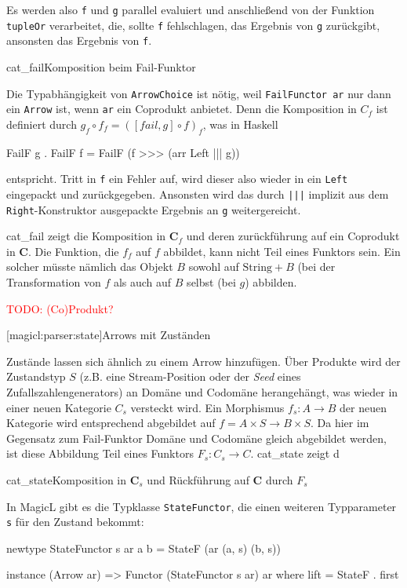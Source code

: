 \documentclass[a4paper, bibgerm]{book}
\newcommand\icode[1]{\lstinline?#1?}
\newcommand{\todo}[1]{
  \textcolor{red}{TODO: #1}
}
\newcommand\lsubsection{}
\newcommand\abb{}
\newcommand\fig{}
\newcommand\ato{\rightarrow} %
\begin{document}
Es werden also \icode{f} und \icode{g} parallel evaluiert und
anschließend von der Funktion \icode{tupleOr} verarbeitet, die, sollte
\icode{f} fehlschlagen, das Ergebnis von \icode{g} zurückgibt, ansonsten
das Ergebnis von \icode{f}.

\fig{cat_fail}{Komposition beim Fail-Funktor}

Die Typabhängigkeit von \icode{ArrowChoice} ist nötig, weil
\icode{FailFunctor ar} nur dann ein \icode{Arrow} ist, wenn \icode{ar}
ein Coprodukt anbietet. Denn die Komposition in $C_{f}$ ist definiert
durch $g_{f} \circ f_{f} = ([fail,g] \circ f)_{f}$, was in Haskell
\begin{code}
FailF g . FailF f = FailF (f >>> (arr Left ||| g))
\end{code} %
entspricht. Tritt in \icode{f} ein Fehler auf, wird dieser also wieder
in ein \icode{Left} eingepackt und zurückgegeben. Ansonsten wird das
durch \icode{|||} implizit aus dem \icode{Right}-Konstruktor ausgepackte
Ergebnis an \icode{g} weitergereicht.

\abb{cat_fail} zeigt die Komposition in $\mathbf{C}_f$ und deren
zurückführung auf ein Coprodukt in $\mathbf{C}$. Die Funktion, die $f_f$
auf $f$ abbildet, kann nicht Teil eines Funktors sein. Ein solcher
müsste nämlich das Objekt $B$ sowohl auf $\mathrm{String}+B$ (bei der
Transformation von $f$ als auch auf $B$ selbst (bei $g$) abbilden.

\todo{(Co)Produkt?}

\lsubsection[magicl:parser:state]{Arrows mit Zuständen}

Zustände lassen sich ähnlich zu einem Arrow hinzufügen. Über Produkte
wird der Zustandstyp $S$ (z.B. eine Stream-Position oder der
\textit{Seed} eines Zufallszahlengenerators) an Domäne und Codomäne
herangehängt, was wieder in einer neuen Kategorie $C_{s}$ versteckt
wird. Ein Morphismus $f_{s} : A \rightarrow B$ der neuen Kategorie wird
entsprechend abgebildet auf $f = A \times S \rightarrow B \times S$. Da
hier im Gegensatz zum Fail-Funktor Domäne und Codomäne gleich abgebildet
werden, ist diese Abbildung Teil eines Funktors $F_s: C_{s}
\ato C$. \abb{cat_state} zeigt d

\fig{cat_state}{Komposition in $\mathbf{C}_s$ und Rückführung auf
  $\mathbf{C}$ durch $F_s$}

In MagicL gibt es die Typklasse \icode{StateFunctor}, die einen weiteren
Typparameter \icode{s} für den Zustand bekommt:

\begin{code}
newtype StateFunctor s ar a b = StateF (ar (a, s) (b, s))

instance (Arrow ar) => Functor (StateFunctor s ar) ar where
    lift = StateF . first
\end{code} %
\end{document}
